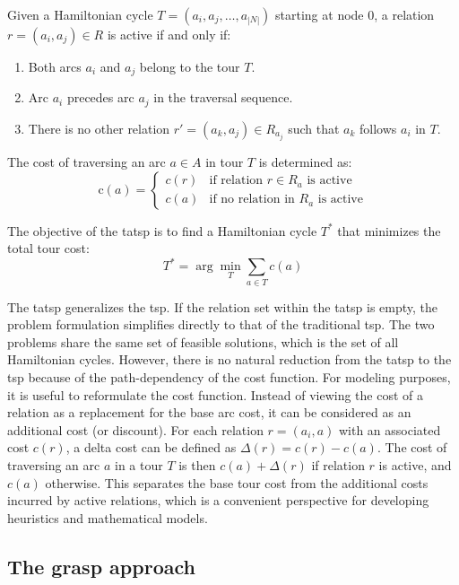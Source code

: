 \documentclass[twocolumn, switch]{article} %
\begin{document}
Given a Hamiltonian cycle $T = (a_i, a_j, \ldots, a_{|N|})$ starting at node $0$, a relation $r = (a_i, a_j) \in R$ is active if and only if:
\begin{enumerate}
\item Both arcs $a_i$ and $a_j$ belong to the tour $T$.
\item Arc $a_i$ precedes arc $a_j$ in the traversal sequence.
\item There is no other relation $r' = (a_k, a_j) \in R_{a_j}$ such that $a_k$ follows $a_i$ in $T$.
\end{enumerate}

The cost of traversing an arc $a \in A$ in tour $T$ is determined as:
\begin{equation}
\text{c}(a) = \begin{cases}
c(r) & \text{if relation } r \in R_a \text{ is active} \\
c(a) & \text{if no relation in } R_a \text{ is active}
\end{cases}
\end{equation}

The objective of the \gls{tatsp} is to find a Hamiltonian cycle $T^*$ that minimizes the total tour cost:
\begin{equation}
T^* = \arg\min_{T} \sum_{a \in T} c(a)
\end{equation}

The \gls{tatsp} generalizes the \gls{tsp}. If the relation set within the \gls{tatsp} is empty, 
the problem formulation simplifies directly to that of the traditional \gls{tsp}.
The two problems share the same set of feasible solutions, which is the set of all Hamiltonian cycles.
However, there is no natural reduction from the \gls{tatsp} to the \gls{tsp} because of the path-dependency of the cost function.
For modeling purposes, it is useful to reformulate the cost function. Instead of viewing the cost of a relation as a replacement for the base arc cost, it can be considered as an additional cost (or discount). For each relation $r = (a_i, a)$ with an associated cost $c(r)$, a delta cost can be defined as $\Delta(r) = c(r) - c(a)$. The cost of traversing an arc $a$ in a tour $T$ is then $c(a) + \Delta(r)$ if relation $r$ is active, and $c(a)$ otherwise. This separates the base tour cost from the additional costs incurred by active relations, which is a convenient perspective for developing heuristics and mathematical models.

\subsection{The \gls{grasp} approach}
\end{document}
